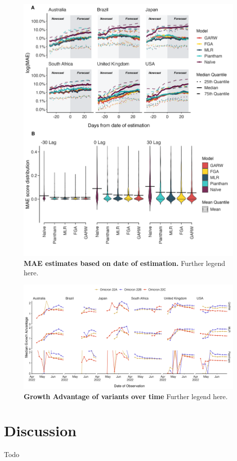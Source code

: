\documentclass[11pt,oneside,letterpaper]{article}
\begin{document}
\begin{figure}[h]
	\centering
	\includegraphics[width=1.0\textwidth]{figures/Figure2.png}
	\caption{\textbf{MAE estimates based on date of estimation.}
	Further legend here.
	}
	\label{Figure 2}
\end{figure}


\begin{figure}[h]
	\centering
	\includegraphics[width=1.0\textwidth]{figures/Figure3.png}
	\caption{\textbf{Growth Advantage of variants over time}
	Further legend here.
	}
	\label{Figure 2}
\end{figure}







\section*{Discussion}

Todo



\end{document}
